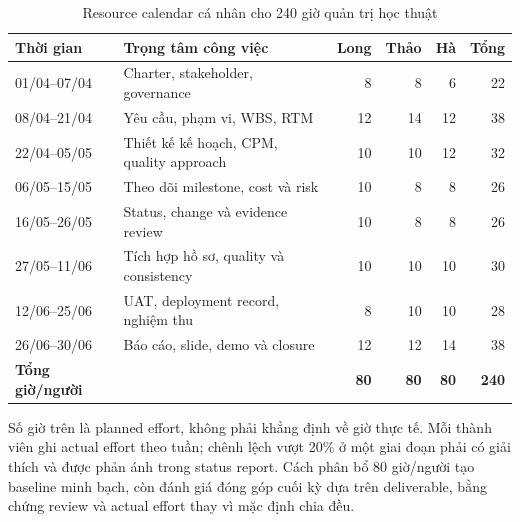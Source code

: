 \begin{table}[H]
\centering
\small
\caption{Resource calendar cá nhân cho 240 giờ quản trị học thuật}
\label{tab:student-resource-calendar}
\begin{tabularx}{\textwidth}{| p{2.3cm} | X | r | r | r | r |}
\hline
\textbf{Thời gian} & \textbf{Trọng tâm công việc} & \textbf{Long} & \textbf{Thảo} & \textbf{Hà} & \textbf{Tổng} \\
\hline
01/04--07/04 & Charter, stakeholder, governance & 8 & 8 & 6 & 22 \\ \hline
08/04--21/04 & Yêu cầu, phạm vi, WBS, RTM & 12 & 14 & 12 & 38 \\ \hline
22/04--05/05 & Thiết kế kế hoạch, CPM, quality approach & 10 & 10 & 12 & 32 \\ \hline
06/05--15/05 & Theo dõi milestone, cost và risk & 10 & 8 & 8 & 26 \\ \hline
16/05--26/05 & Status, change và evidence review & 10 & 8 & 8 & 26 \\ \hline
27/05--11/06 & Tích hợp hồ sơ, quality và consistency & 10 & 10 & 10 & 30 \\ \hline
12/06--25/06 & UAT, deployment record, nghiệm thu & 8 & 10 & 10 & 28 \\ \hline
26/06--30/06 & Báo cáo, slide, demo và closure & 12 & 12 & 14 & 38 \\
\hline
\textbf{Tổng giờ/người} & & \textbf{80} & \textbf{80} & \textbf{80} & \textbf{240} \\
\hline
\end{tabularx}
\end{table}

Số giờ trên là planned effort, không phải khẳng định về giờ thực tế. Mỗi thành viên ghi actual effort theo tuần; chênh lệch vượt 20\% ở một giai đoạn phải có giải thích và được phản ánh trong status report. Cách phân bổ 80 giờ/người tạo baseline minh bạch, còn đánh giá đóng góp cuối kỳ dựa trên deliverable, bằng chứng review và actual effort thay vì mặc định chia đều.

